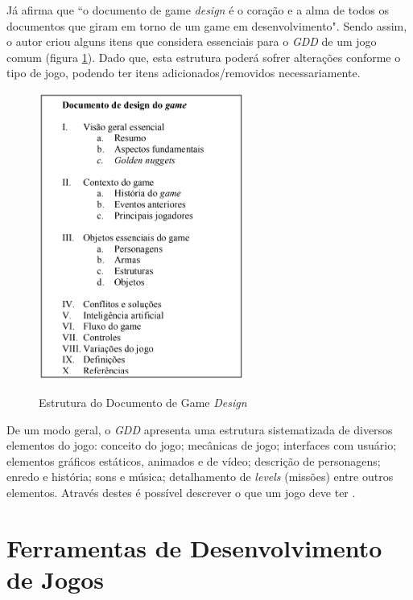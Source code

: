 Já  afirma que ``o documento de game \textit{design} é o coração e a alma de todos os documentos que giram em torno de um game em desenvolvimento". Sendo assim, o autor criou alguns itens que considera essenciais para o \textit{GDD} de um jogo comum (figura \ref{fig:estrutura-gdd}). Dado que, esta estrutura poderá sofrer alterações conforme o tipo de jogo, podendo ter itens adicionados/removidos necessariamente.

\begin{figure}[H]
	\centering
	\caption{Estrutura do Documento de Game \textit{Design}}
	\includegraphics[width=0.6\textwidth]{figuras/estrutura_gdd}
	\label{fig:estrutura-gdd}
	{}
\end{figure}

De um modo geral, o \textit{GDD} apresenta uma estrutura sistematizada de diversos elementos do jogo: conceito do jogo; mecânicas de jogo; interfaces com usuário; elementos gráficos estáticos, animados e de vídeo; descrição de personagens; enredo e história; sons e música; detalhamento de \textit{levels} (missões) entre outros elementos. Através destes é possível descrever o que um jogo deve ter \cite{bib:motta2013}.

\section{Ferramentas de Desenvolvimento de Jogos}
\label{sec:ferramentas}

